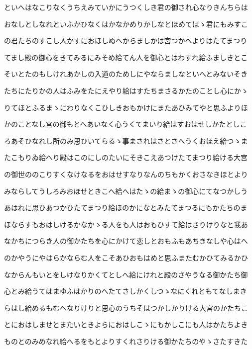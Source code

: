\documentclass[a4paper,11pt,landscape]{ltjtarticle}
\begin{document}
\par\medskip
といへはなこりなくうちえみていかにうつくしき君の御され心なりきんちらは
\par\medskip
おなしとしなれといふかひなくはかなかめりかしなとほめてはゝ君にもみすこ
\par\medskip
の君たちのすこし人かすにおほしぬへからましかは宮つかへよりはたてまつり
\par\medskip
てまし殿の御心をきてみるにみそめ給てん人を御心とはわすれ給ふましきとこ
\par\medskip
そいとたのもしけれあかしの入道のためしにやならましなといへとみないそき
\par\medskip
たちにたりかの人はふみをたにえやり給はすたちまさるかたのことし心にかゝ
\par\medskip
りてほとふるまゝにわりなくこひしきおもかけにまたあひみてやと思ふよりほ
\par\medskip
かのことなし宮の御もとへあいなく心うくてまいり給はすおはせしかたとしこ
\par\medskip
ろあそひなれし所のみ思ひいてらるゝ事まされはさとさへうくおほえ給つゝま
\par\medskip
たこもりゐ給へり殿はこのにしのたいにそきこえあつけたてまつり給ける大宮
\par\medskip
の御世ののこりすくなけなるをおはせすなりなんのちもかくおさなきほとより
\par\medskip
みならしてうしろみおほせときこへ給へはたゝの給まゝの御心にてなつかしう
\par\medskip
あはれに思ひあつかひたてまつり給ほのかになとみたてまつるにもかたちのま
\par\medskip
ほならすもおはしけるかなかゝる人をも人はおもひすて給はさりけりなと我あ
\par\medskip
なかちにつらき人の御かたちを心にかけて恋しとおもふもあちきなしや心はへ
\par\medskip
のかやうにやはらかならむ人をこそあひおもはめと思ふまたむかひてみるかひ
\par\medskip
なからんもいとをしけなりかくてとしへ給にけれと殿のさやうなる御かたち御
\par\medskip
心とみ給うてはまゆふはかりのへたてさしかくしつゝなにくれともてなしまき
\par\medskip
らはし給めるもむへなりけりと思心のうちそはつかしかりける大宮のかたちこ
\par\medskip
とにおはしませとまたいときよらにおはしこゝにもかしこにも人はかたちよき
\par\medskip
ものとのみめなれ給へるをもとよりすくれさりける御かたちのやゝさたすきた
\end{document}
